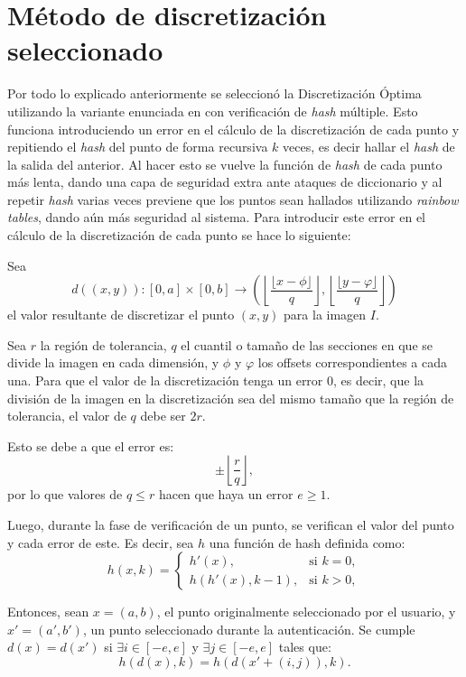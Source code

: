 \section{Método de discretización seleccionado}
Por todo lo explicado anteriormente se seleccion\'o la Discretizaci\'on \'Optima utilizando la variante enunciada en \cite{bicakci2008optimal} con verificaci\'on de \textit{hash} m\'ultiple. Esto funciona introduciendo un error en el c\'alculo de la discretizaci\'on de cada punto y repitiendo el \textit{hash} del punto de forma recursiva $k$ veces, es decir hallar el \textit{hash} de la salida del anterior. Al hacer esto se vuelve la funci\'on de \textit{hash} de cada punto m\'as lenta, dando una capa de seguridad extra ante ataques de diccionario y al repetir \textit{hash} varias veces previene que los puntos sean hallados utilizando \textit{rainbow tables}, dando a\'un m\'as seguridad al sistema.
Para introducir este error en el c\'alculo de la discretizaci\'on de cada punto se hace lo siguiente:

Sea 
\[
d((x,y)) : [0,a] \times [0,b] \to \left(\left\lfloor \frac{\lfloor x - \phi \rfloor}{q} \right\rfloor, \left\lfloor \frac{\lfloor y - \varphi \rfloor}{q} \right\rfloor\right)
\]
el valor resultante de discretizar el punto \((x,y)\) para la imagen \(I\). 

Sea \(r\) la región de tolerancia, \(q\) el cuantil o tamaño de las secciones en que se divide la imagen en cada dimensión, y \(\phi\) y \(\varphi\) los offsets correspondientes a cada una. Para que el valor de la discretización tenga un error \(0\), es decir, que la división de la imagen en la discretización sea del mismo tamaño que la región de tolerancia, el valor de \(q\) debe ser \(2r\). 

Esto se debe a que el error es:
\[
\pm \left\lfloor \frac{r}{q} \right\rfloor,
\]
por lo que valores de \(q \leq r\) hacen que haya un error \(e \geq 1\).

Luego, durante la fase de verificación de un punto, se verifican el valor del punto y cada error de este. Es decir, sea \(h\) una función de hash definida como:
\[
h(x, k) = 
\begin{cases} 
	h'(x), & \text{si } k = 0, \\
	h(h'(x), k-1), & \text{si } k > 0,
\end{cases}
\]


Entonces, sean \(x = (a,b)\), el punto originalmente seleccionado por el usuario, y \(x' = (a',b')\), un punto seleccionado durante la autenticación. Se cumple \(d(x) = d(x')\) si \(\exists i \in [-e, e]\) y \(\exists j \in [-e, e]\) tales que:
\[
h(d(x), k) = h(d(x' + (i, j)), k).
\]

